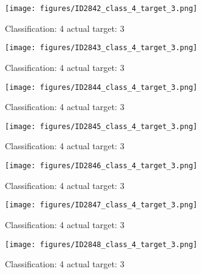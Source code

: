 \begin{figure}[h!]
\begin{center}
\texttt{[image: figures/ID2842\_class\_4\_target\_3.png]}
\end{center}
\caption{ Classification: 4 actual target: 3}
\label{fig:ID2842_class_4_target_3}
\end{figure}
\begin{figure}[h!]
\begin{center}
\texttt{[image: figures/ID2843\_class\_4\_target\_3.png]}
\end{center}
\caption{ Classification: 4 actual target: 3}
\label{fig:ID2843_class_4_target_3}
\end{figure}
\begin{figure}[h!]
\begin{center}
\texttt{[image: figures/ID2844\_class\_4\_target\_3.png]}
\end{center}
\caption{ Classification: 4 actual target: 3}
\label{fig:ID2844_class_4_target_3}
\end{figure}
\begin{figure}[h!]
\begin{center}
\texttt{[image: figures/ID2845\_class\_4\_target\_3.png]}
\end{center}
\caption{ Classification: 4 actual target: 3}
\label{fig:ID2845_class_4_target_3}
\end{figure}
\begin{figure}[h!]
\begin{center}
\texttt{[image: figures/ID2846\_class\_4\_target\_3.png]}
\end{center}
\caption{ Classification: 4 actual target: 3}
\label{fig:ID2846_class_4_target_3}
\end{figure}
\begin{figure}[h!]
\begin{center}
\texttt{[image: figures/ID2847\_class\_4\_target\_3.png]}
\end{center}
\caption{ Classification: 4 actual target: 3}
\label{fig:ID2847_class_4_target_3}
\end{figure}
\begin{figure}[h!]
\begin{center}
\texttt{[image: figures/ID2848\_class\_4\_target\_3.png]}
\end{center}
\caption{ Classification: 4 actual target: 3}
\label{fig:ID2848_class_4_target_3}
\end{figure}
